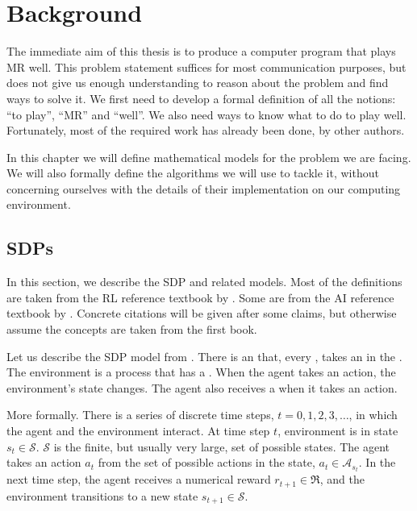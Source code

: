 \chapter{Background}
The immediate aim of this thesis is to produce a computer program that plays
\acl{MR} well. This problem statement suffices for most communication purposes,
but does not give us enough understanding to reason about the problem and find
ways to solve it. We first need to develop a formal definition of all the
notions: ``to play'', ``\acl{MR}'' and ``well''. We also need ways to know what
to do to play well. Fortunately, most of the required work has already been
done, by other authors.

In this chapter we will define mathematical models for the problem we are
facing. We will also formally define the algorithms we will use to tackle it,
without concerning ourselves with the details of their implementation on our
computing environment.

\section{\aclp{SDP}}
In this section, we describe the \acf{SDP} and related models. Most of the
definitions are taken from the \ac{RL} reference textbook by
\citet{sutton1998introduction}. Some are from the \ac{AI} reference textbook by
\citet{russell2009aima}. Concrete citations will be given after some claims, but
otherwise assume the concepts are taken from the first book.

Let us describe the \ac{SDP} model from
\citet[Section~3.1]{sutton1998introduction}. There is an  that, every
, takes an  in the . The
environment is a process that has a . When the agent takes an
action, the environment's state changes. The agent also receives a 
when it takes an action.

More formally. There is a series of discrete time steps, $t=0,1,2,3,\dots$, in
which the agent and the environment interact. At time step $t$, environment is
in state $s_t \in \mathcal{S}$. $\mathcal{S}$ is the finite, but usually very
large, set of possible states. The agent takes an action $a_t$ from the set of
possible actions in the state, $a_t \in \mathcal{A}_{s_t}$. In the next time
step, the agent receives a numerical reward $r_{t+1} \in \mathfrak{R}$, and the
environment transitions to a new state $s_{t+1} \in \mathcal{S}$.

